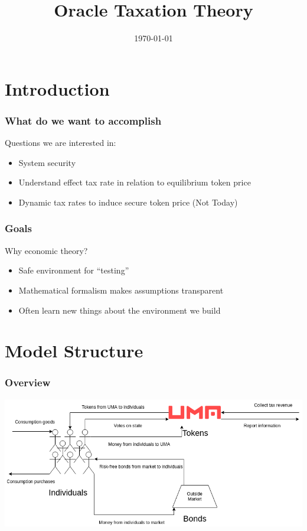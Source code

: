 \documentclass[10pt]{beamer}
\title{Oracle Taxation Theory}
\date[]{\today}
\begin{document}
\begin{frame}
  \titlepage
\end{frame}

\section{Introduction}

\begin{frame} \frametitle{What do we want to accomplish}

  Questions we are interested in:

  \begin{itemize}
    \item System security
    \item Understand effect tax rate in relation to equilibrium token price
    \item Dynamic tax rates to induce secure token price \alert{(Not Today)}
  \end{itemize}

\end{frame}

\begin{frame} \frametitle{Goals}

  Why economic theory?

  \begin{itemize}
    \item Safe environment for ``testing''
    \item Mathematical formalism makes assumptions transparent
    \item Often learn new things about the environment we build
  \end{itemize}

\end{frame}

\section{Model Structure}

\begin{frame} \frametitle{Overview}

  \begin{center}
    \includegraphics[width=0.8\paperwidth]{ModelOverview.png}
  \end{center}

\end{frame}
\end{document}
